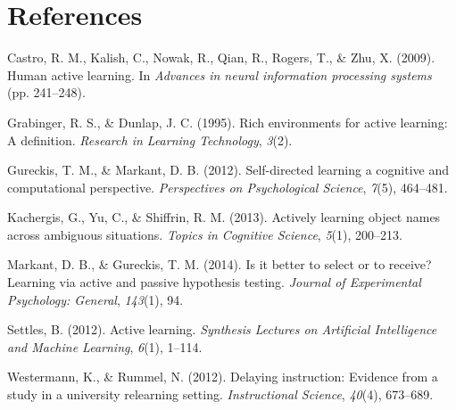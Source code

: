 \documentclass[10pt, letterpaper]{article}
\begin{document}
\section{References}\label{references}

\setlength{\parindent}{-0.1in} \setlength{\leftskip}{0.125in} \noindent

Castro, R. M., Kalish, C., Nowak, R., Qian, R., Rogers, T., \& Zhu, X.
(2009). Human active learning. In \emph{Advances in neural information
processing systems} (pp. 241--248).

Grabinger, R. S., \& Dunlap, J. C. (1995). Rich environments for active
learning: A definition. \emph{Research in Learning Technology},
\emph{3}(2).

Gureckis, T. M., \& Markant, D. B. (2012). Self-directed learning a
cognitive and computational perspective. \emph{Perspectives on
Psychological Science}, \emph{7}(5), 464--481.

Kachergis, G., Yu, C., \& Shiffrin, R. M. (2013). Actively learning
object names across ambiguous situations. \emph{Topics in Cognitive
Science}, \emph{5}(1), 200--213.

Markant, D. B., \& Gureckis, T. M. (2014). Is it better to select or to
receive? Learning via active and passive hypothesis testing.
\emph{Journal of Experimental Psychology: General}, \emph{143}(1), 94.

Settles, B. (2012). Active learning. \emph{Synthesis Lectures on
Artificial Intelligence and Machine Learning}, \emph{6}(1), 1--114.

Westermann, K., \& Rummel, N. (2012). Delaying instruction: Evidence
from a study in a university relearning setting. \emph{Instructional
Science}, \emph{40}(4), 673--689.
\end{document}
